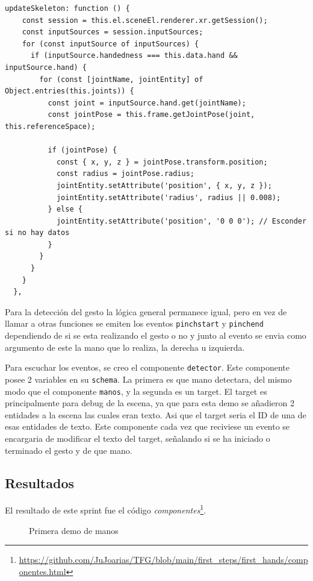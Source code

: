 \documentclass[a4paper, 12pt]{book}
\begin{document}
\begin{lstlisting}[caption=Actualización de las manos, captionpos=b, label=lst:nuevas_manos]
  updateSkeleton: function () {
    const session = this.el.sceneEl.renderer.xr.getSession();
    const inputSources = session.inputSources;
    for (const inputSource of inputSources) {
      if (inputSource.handedness === this.data.hand && inputSource.hand) {
        for (const [jointName, jointEntity] of Object.entries(this.joints)) {
          const joint = inputSource.hand.get(jointName);
          const jointPose = this.frame.getJointPose(joint, this.referenceSpace);
          
          if (jointPose) {
            const { x, y, z } = jointPose.transform.position;
            const radius = jointPose.radius; 
            jointEntity.setAttribute('position', { x, y, z });
            jointEntity.setAttribute('radius', radius || 0.008);
          } else {
            jointEntity.setAttribute('position', '0 0 0'); // Esconder si no hay datos
          }
        }
      }
    }
  },
\end{lstlisting}

Para la detección del gesto la lógica general permanece igual, pero en vez de llamar a otras funciones se emiten los eventos \texttt{pinchstart} y \texttt{pinchend} dependiendo de si se esta realizando el gesto o no y junto al evento se envia como argumento de este la mano que lo realiza, la derecha u izquierda.

Para escuchar los eventos, se creo el componente \texttt{detector}. Este componente posee 2 variables en su \texttt{schema}. La primera es que mano detectara, del mismo modo que el componente \texttt{manos}, y la segunda es un target. El target es principalmente para debug de la escena, ya que para esta demo se añadieron 2 entidades a la escena las cuales 
eran texto. Asi que el target seria el ID de una de esas entidades de texto.
Este componente cada vez que reciviese un evento se encargaria de modificar el texto del target, señalando si se ha iniciado o terminado el gesto y de que mano. 

\subsection{Resultados}
\label{subsec:resultados2}
El resultado de este sprint fue el código \textit{componentes}\footnote{\url{https://github.com/JuJoarias/TFG/blob/main/first_steps/first_hands/componentes.html}}.

\begin{figure}[H] 
  \centering
  \fbox{\rule{0pt}{150pt} \rule{0.7\textwidth}{0pt}} 
  \caption{Primera demo de manos}
  \label{fig:sprint2}
\end{figure}
\end{document}
